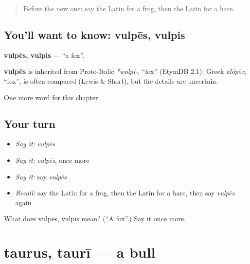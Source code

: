 \label{lesson:LA-C133-vulpes}



\begin{quote}
Before the new one: say the Latin for a frog, then the Latin for a hare.
\end{quote}

\subsection*{You'll want to know: vulpēs, vulpis}
\textbf{vulpēs, vulpis} — \textquotedblleft{}a fox\textquotedblright{}.

\begin{cousinweb}
\textbf{vulpēs} is inherited from Proto-Italic \emph{*wolpi-}, \textquotedblleft{}fox\textquotedblright{} (EtymDB 2.1); Greek \emph{alōpēx}, \textquotedblleft{}fox\textquotedblright{}, is often compared (Lewis \& Short), but the details are uncertain.
\end{cousinweb}

\begin{grammarlens}[title={What you've built}]
One more word for this chapter.
\end{grammarlens}

\subsection*{Your turn}
\begin{itemize}
\raggedright
  \item \emph{Say it:} \emph{vulpēs}
  \item \emph{Say it:} \emph{vulpēs}, once more
  \item \emph{Say it:} say \emph{vulpēs}
  \item \emph{Recall:} say the Latin for a frog, then the Latin for a hare, then say \emph{vulpēs} again
\end{itemize}

\begin{tcolorbox}[breakable,colback=teal!4,colframe=teal!35!black,title={Before you move on}]
What does vulpēs, vulpis mean? (\textquotedblleft{}A fox\textquotedblright{}.) Say it once more.
\end{tcolorbox}
\section[taurus, taurī]{taurus, taurī — a bull}

\label{lesson:LA-C133-taurus}



